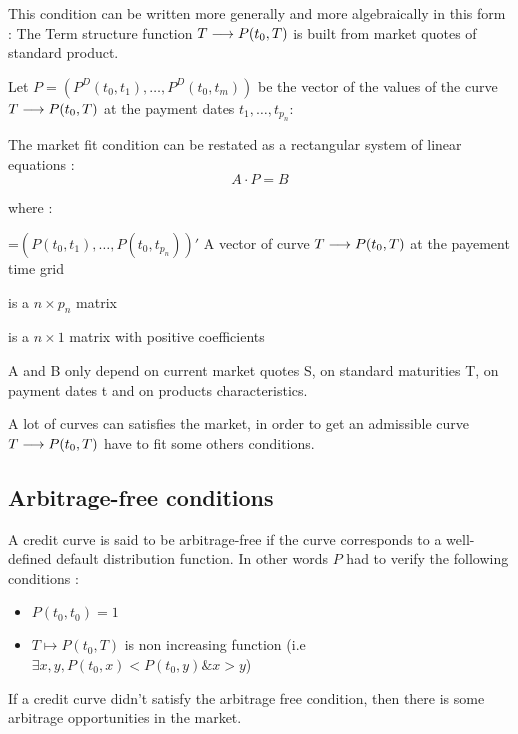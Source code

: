 \sauta
This condition can be written more generally and more algebraically in this form :
The Term  structure function $T  \longrightarrow P(t_0,T)$ is  built from market  quotes of
standard product.


Let $P=(P^D(t_0,t_1),\dots,P^D(t_0,t_m))$  be the  vector of  the values  of the
curve $T \longrightarrow P(t_0,T)$ at the payment dates $t_1,\dots,t_{p_n}$: 

The  market fit  condition can  be restated  as a  rectangular system  of linear
equations :
\[
A \cdot P=B
\]

where :
\begin{description}
\item[P] =$(P(t_0,t_1),\dots,P(t_{0},t_{p_n}))'$ A vector of curve $T \longrightarrow P(t_0,T)$ at the
  payement time grid
\item[A] is a $n \times p_n$ matrix
\item[B] is a $n \times 1$ matrix with positive coefficients
\item A and B only depend on current market quotes S, on standard maturities T, on payment dates t and on products characteristics.
\end{description}

A lot of curves can satisfies the market, in order to get an admissible curve $T \longrightarrow P(t_0,T)$ have to fit some others
conditions. 

\subsection{Arbitrage-free conditions}
\label{sec:arbitr-free-cond}

\begin{de}
  \label{def:2.1}
  A credit  curve is  said to be  arbitrage-free if the  curve corresponds  to a
  well-defined default distribution  function. In other words $P$  had to verify
  the following conditions :
  \begin{itemize}
  \item $P(t_0,t_0)=1$
  \item $T\longmapsto P(t_0,T)$ is non increasing function (i.e $\exists x,y, P(t_0,x)<P(t_0,y)\&x>y$)
  \end{itemize}
\end{de}

\begin{example}[NB]
  \label{arbitrage-free}
  If a credit  curve didn't satisfy the arbitrage free  condition, then there is
  some arbitrage opportunities in the market. 
\end{example}

